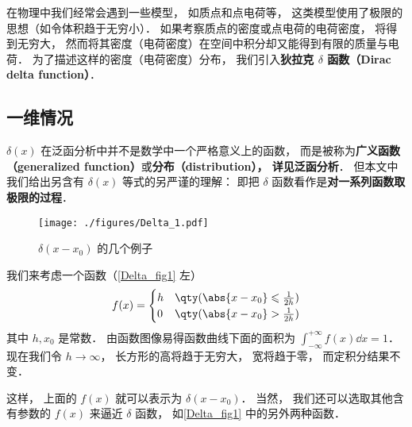 
\begin{issues}
\issueTODO
\end{issues}

在物理中我们经常会遇到一些模型， 如质点和点电荷等， 这类模型使用了极限的思想（如令体积趋于无穷小）． 如果考察质点的密度或点电荷的电荷密度， 将得到无穷大， 然而将其密度（电荷密度）在空间中积分却又能得到有限的质量与电荷． 为了描述这样的密度（电荷密度）分布， 我们引入\textbf{狄拉克 $\delta$ 函数（Dirac delta function）}．

\subsection{一维情况}

$\delta(x)$ 在泛函分析中并不是数学中一个严格意义上的函数， 而是被称为\textbf{广义函数（generalized function）}或\textbf{分布（distribution）， 详见泛函分析}． 但本文中我们给出另含有 $\delta(x)$ 等式的另严谨的理解： 即把 $\delta$ 函数看作是\textbf{对一系列函数取极限的过程}．

\begin{figure}[ht]
\centering
\texttt{[image: ./figures/Delta\_1.pdf]}
\caption{$\delta(x - x_0)$ 的几个例子} \label{Delta_fig1}
\end{figure}
我们来考虑一个函数（\autoref{Delta_fig1} 左）
\begin{equation}\label{Delta_eq6}
f(x) =
\begin{cases}
h & \qty( \abs{x - x_0} \leqslant \frac{1}{2h} )\\
0 & \qty( \abs{x - x_0} > \frac{1}{2h} )
\end{cases}
\end{equation}
其中 $h, x_0$ 是常数． 由函数图像易得函数曲线下面的面积为 $\int_{-\infty}^{+\infty} f(x) \dd{x} = 1$． 现在我们令 $h \to \infty$， 长方形的高将趋于无穷大， 宽将趋于零， 而定积分结果不变．

这样， 上面的 $f(x)$ 就可以表示为 $\delta(x - x_0)$． 当然， 我们还可以选取其他含有参数的 $f(x)$ 来逼近 $\delta$ 函数， 如\autoref{Delta_fig1} 中的另外两种函数．

